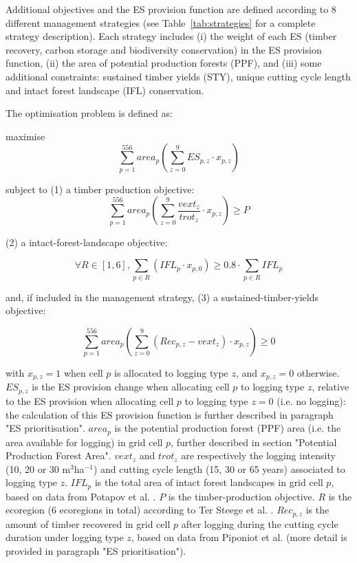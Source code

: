 \documentclass[12pt]{article}
\begin{document}
Additional objectives and the ES provision function are defined according to 8 different management strategies (see Table~\ref{tab:strategies} for a complete strategy description). Each strategy includes (i) the weight of each ES (timber recovery, carbon storage and biodiversity conservation) in the ES provision function, (ii) the area of potential production forests (PPF), and (iii) some additional constraints: sustained timber yields (STY), unique cutting cycle length and intact forest landscape (IFL) conservation. 

The optimisation problem is defined as: 

maximise
\begin{equation}
\sum_{p=1}^{556} area_{p} \left( \sum_{z=0}^{9} ES_{p,z} \cdot x_{p,z} \right) 
\end{equation}

subject to (1) a timber production objective:
\begin{equation}
\sum_{p=1}^{556} area_{p} \left( \sum_{z=0}^{9}\frac{ vext_{z} }{ trot_{z}} \cdot x_{p,z} \right)  \geq P
\end{equation}

(2) a intact-forest-landscape objective: 

\begin{equation}
\forall R \in [1,6], \sum_{p\in R} (IFL_p \cdot x_{p,0}) \geq 0.8 \cdot \sum_{p\in R} IFL_p 
\end{equation}

and, if included in the management strategy, (3) a sustained-timber-yields objective: 

\begin{equation}
\sum_{p=1}^{556} area_{p} \left( \sum_{z=0}^{9}  ( Rec_{p,z} - vext_{z} )\cdot x_{p,z}   \right) \geq 0
\end{equation}

with $x_{p,z} = 1$ when cell $p$ is allocated to logging type $z$, and $x_{p,z} = 0$ otherwise. $ES_{p,z}$ is the ES provision change when allocating cell $p$ to logging type $z$, relative to the ES provision when allocating cell $p$ to logging type $z=0$ (i.e. no logging): the calculation of this ES provision function is further described in paragraph "ES prioritisation". $area_{p}$ is the potential production forest (PPF) area (i.e. the area available for logging) in grid cell $p$, further described in section "Potential Production Forest Area". $vext_{z}$ and $trot_{z}$ are respectively the logging intensity (10, 20 or 30 m$^3$ha$^{-1}$) and cutting cycle length (15, 30 or 65 years) associated to logging type $z$. $IFL_p$ is the total area of intact forest landscapes in grid cell $p$, based on data from Potapov et al. \cite{Potapov2017}. $P$ is the timber-production objective. $R$ is the ecoregion (6 ecoregions in total) according to Ter Steege et al. \cite{TerSteege2013}.	$Rec_{p,z}$ is the amount of timber recovered in grid cell $p$ after logging during the cutting cycle duration under logging type $z$, based on data from Piponiot et al. \cite{Piponiot2019} (more detail is provided in paragraph "ES prioritisation"). 
\end{document}
